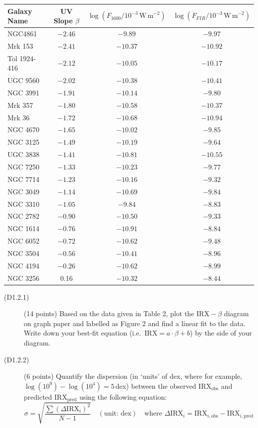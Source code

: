 \begin{center}
\begin{tabular}{l|c|c|c}
Galaxy Name & UV Slope $\beta$
  & $\log(F_{1600}/10^{-3}\,\mathrm{W\,m}^{-2})$
  & $\log(F_{FIR}/10^{-3}\,\mathrm{W\,m}^{-2})$ \\
\hline
NGC4861      & $-2.46$ & $-9.89$  & $-9.97$  \\
Mrk 153      & $-2.41$ & $-10.37$ & $-10.92$ \\
Tol 1924-416 & $-2.12$ & $-10.05$ & $-10.17$ \\
UGC 9560     & $-2.02$ & $-10.38$ & $-10.41$ \\
NGC 3991     & $-1.91$ & $-10.14$ & $-9.80$  \\
Mrk 357      & $-1.80$ & $-10.58$ & $-10.37$ \\
Mrk 36       & $-1.72$ & $-10.68$ & $-10.94$ \\
NGC 4670     & $-1.65$ & $-10.02$ & $-9.85$  \\
NGC 3125     & $-1.49$ & $-10.19$ & $-9.64$  \\
UGC 3838     & $-1.41$ & $-10.81$ & $-10.55$ \\
NGC 7250     & $-1.33$ & $-10.23$ & $-9.77$  \\
NGC 7714     & $-1.23$ & $-10.16$ & $-9.32$  \\
NGC 3049     & $-1.14$ & $-10.69$ & $-9.84$  \\
NGC 3310     & $-1.05$ & $-9.84$  & $-8.83$  \\
NGC 2782     & $-0.90$ & $-10.50$ & $-9.33$  \\
NGC 1614     & $-0.76$ & $-10.91$ & $-8.84$  \\
NGC 6052     & $-0.72$ & $-10.62$ & $-9.48$  \\
NGC 3504     & $-0.56$ & $-10.41$ & $-8.96$  \\
NGC 4194     & $-0.26$ & $-10.62$ & $-8.99$  \\
NGC 3256     & 0.16    & $-10.32$ & $-8.44$  \\
\end{tabular}
\end{center}

\begin{description}
\item[(D1.2.1)] (14 points) Based on the data given in Table 2, plot the
  $\mathrm{IRX}-\beta$ diagram on graph paper and labelled as Figure 2 and
  find a linear fit to the data. Write down your best-fit equation (i.e.\
  $\mathrm{IRX} = a \cdot \beta + b$) by the side of your diagram.
\item[(D1.2.2)] (6 points) Quantify the dispersion (in `units' of dex, where
  for example, $\log(10^9) - \log(10^4) = 5$\,dex) between the observed
  $\mathrm{IRX}_{\mathrm{obs}}$ and predicted $\mathrm{IRX}_{\mathrm{pred}}$
  using the following equation:
  \[ \sigma = \sqrt{\frac{\sum (\Delta\mathrm{IRX}_i)^2}{N-1}}
     \quad (\text{unit: dex}) \quad \text{where }
     \Delta\mathrm{IRX}_i = \mathrm{IRX}_{i,\mathrm{obs}}
       - \mathrm{IRX}_{i,\mathrm{pred}} \]
\end{description}

